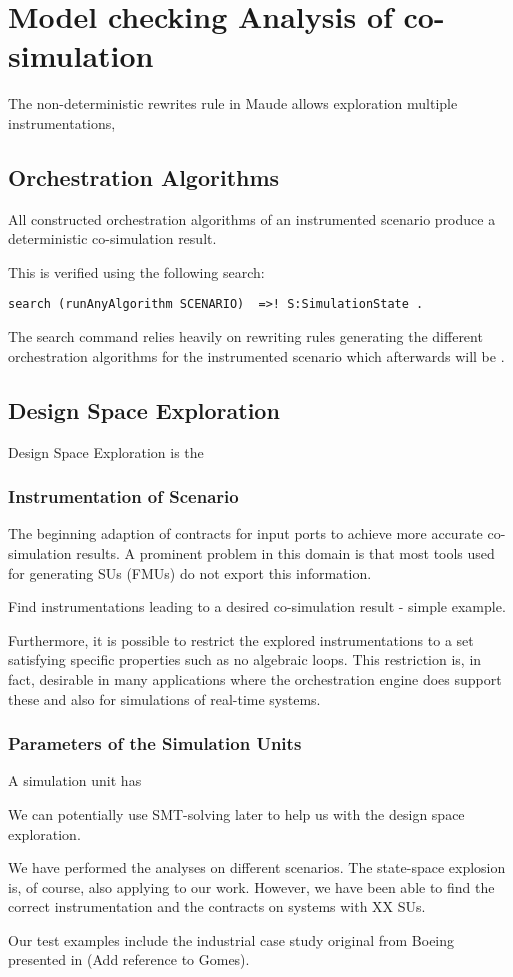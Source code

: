\section{Model checking Analysis of co-simulation}
The non-deterministic rewrites rule in Maude allows exploration multiple instrumentations, 


\subsection{Orchestration Algorithms}
\begin{lemma}
\end{lemma}
All constructed orchestration algorithms of an instrumented scenario produce a deterministic co-simulation result.

This is verified using the following search:
\begin{lstlisting}
search (runAnyAlgorithm SCENARIO)  =>! S:SimulationState .
\end{lstlisting}

The search command relies heavily on rewriting rules generating the different orchestration algorithms for the instrumented scenario which afterwards will be .  

\subsection{Design Space Exploration}
Design Space Exploration is the 

\subsubsection{Instrumentation of Scenario}
The beginning adaption of contracts for input ports to achieve more accurate co-simulation results. 
A prominent problem in this domain is that most tools used for generating SUs (FMUs) do not export this information.


Find instrumentations leading to a desired co-simulation result - simple example. 



Furthermore, it is possible to restrict the explored instrumentations to a set satisfying specific properties such as no algebraic loops.
This restriction is, in fact, desirable in many applications where the orchestration engine does support these and also for simulations of real-time systems.

\subsubsection{Parameters of the Simulation Units}
A simulation unit has 



We can potentially use SMT-solving later to help us with the design space exploration.


We have performed the analyses on different scenarios. 
The state-space explosion is, of course, also applying to our work. 
However, we have been able to find the correct instrumentation and the contracts on systems with XX SUs.

Our test examples include the industrial case study original from Boeing presented in (Add reference to Gomes). 